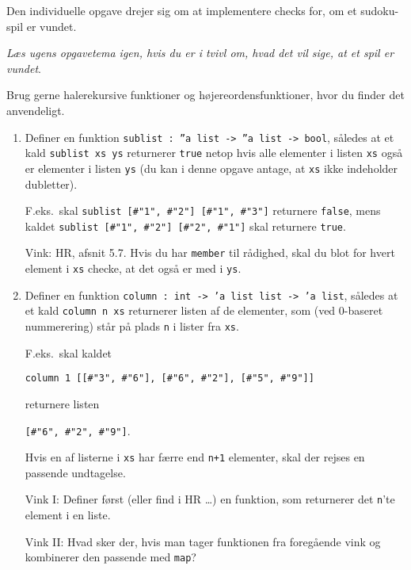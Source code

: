 \documentclass[a4paper]{article}
\begin{document}
Den individuelle opgave drejer sig om at implementere checks for, om
et sudoku-spil er vundet.

\emph{L{\ae}s ugens opgavetema igen, hvis du er i tvivl om, hvad det vil sige, at et spil er vundet}.

Brug gerne halerekursive funktioner og h{\o}jereordensfunktioner, hvor du finder det anvendeligt.

\begin{enumerate}[{6I}1]

\item{Definer en funktion \texttt{sublist :\ ''a list -> ''a list -> bool},
s{\aa}ledes at et kald\newline
\texttt{sublist xs ys} returnerer \texttt{true}
netop hvis alle elementer i listen \texttt{xs} ogs{\aa} er elementer i listen \texttt{ys} (du kan i denne opgave antage, at \texttt{xs} ikke indeholder dubletter).

F.eks.\ skal \texttt{sublist [\#"1", \#"2"] [\#"1", \#"3"]} returnere
\texttt{false}, mens kaldet
\texttt{sublist [\#"1", \#"2"] [\#"2", \#"1"]} skal returnere \texttt{true}.

Vink: HR, afsnit 5.7. Hvis du har \texttt{member} til r{\aa}dighed,
skal du blot for hvert element i \texttt{xs} checke, at det ogs{\aa} er med i
\texttt{ys}.}


\item{Definer en funktion \texttt{column :\ int -> 'a list list -> 'a list},
s{\aa}ledes at et kald \texttt{column n xs} returnerer listen
af de elementer, som (ved 0-baseret nummerering)
st{\aa}r p{\aa} plads \texttt{n} i lister fra \texttt{xs}.

F.eks.\ skal kaldet

\texttt{column 1 [[\#"3", \#"6"], [\#"6", \#"2"], [\#"5", \#"9"]]}

returnere listen

\texttt{[\#"6", \#"2", \#"9"]}.

Hvis en af listerne i \texttt{xs} har f{\ae}rre end \texttt{n+1} elementer, skal der rejses en passende undtagelse.

Vink I: Definer f{\o}rst (eller find i HR \ldots) en funktion,
som returnerer det \texttt{n}'te element i en liste.

Vink II: Hvad sker der, hvis man tager funktionen fra foreg{\aa}ende vink og kombinerer den passende
med \texttt{map}?}


\end{enumerate}
\end{document}

